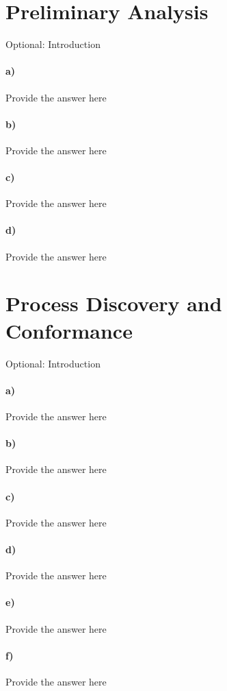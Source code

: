 \documentclass[12pt]{report}
\begin{document}
\section{Preliminary Analysis}
\textlangle Optional: Introduction \textrangle
\paragraph{a)} \textlangle Provide the answer here\textrangle
\paragraph{b)} \textlangle Provide the answer here\textrangle
\paragraph{c)} \textlangle Provide the answer here\textrangle
\paragraph{d)} \textlangle Provide the answer here\textrangle

\section{Process Discovery and Conformance}
\textlangle Optional: Introduction \textrangle
\paragraph{a)} \textlangle Provide the answer here\textrangle
\paragraph{b)} \textlangle Provide the answer here\textrangle
\paragraph{c)} \textlangle Provide the answer here\textrangle
\paragraph{d)} \textlangle Provide the answer here\textrangle
\paragraph{e)} \textlangle Provide the answer here\textrangle
\paragraph{f)} \textlangle Provide the answer here\textrangle
\end{document}
